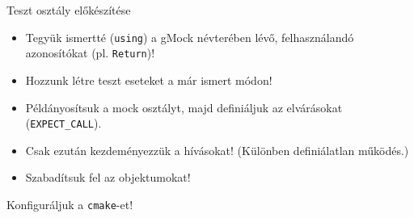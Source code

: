 \documentclass[usenames,dvipsnames,aspectratio=169]{beamer}
\begin{document}
\begin{frame}
    \begin{exampleblock}{}
        \footnotesize
        
    \end{exampleblock}
\end{frame}

\begin{frame}
    Teszt osztály előkészítése
    \begin{itemize}
        \item Tegyük ismertté (\texttt{using}) a gMock névterében lévő, felhasználandó azonosítókat (pl. \texttt{Return})!
        \item Hozzunk létre teszt eseteket a már ismert módon!
        \item Példányosítsuk a mock osztályt, majd definiáljuk az elvárásokat (\texttt{EXPECT\_CALL}).
        \item Csak ezután kezdeményezzük a hívásokat! (Különben definiálatlan működés.)
        \item Szabadítsuk fel az objektumokat!
    \end{itemize}
\end{frame}

\begin{frame}
    \begin{exampleblock}{}
        \footnotesize
        
    \end{exampleblock}
\end{frame}

\begin{frame}
    \begin{exampleblock}{}
        \footnotesize
        
    \end{exampleblock}
\end{frame}

\begin{frame}{}
    Konfiguráljuk a \texttt{cmake}-et!
    \begin{exampleblock}{}
        \footnotesize
        
    \end{exampleblock}
\end{frame}
\end{document}
